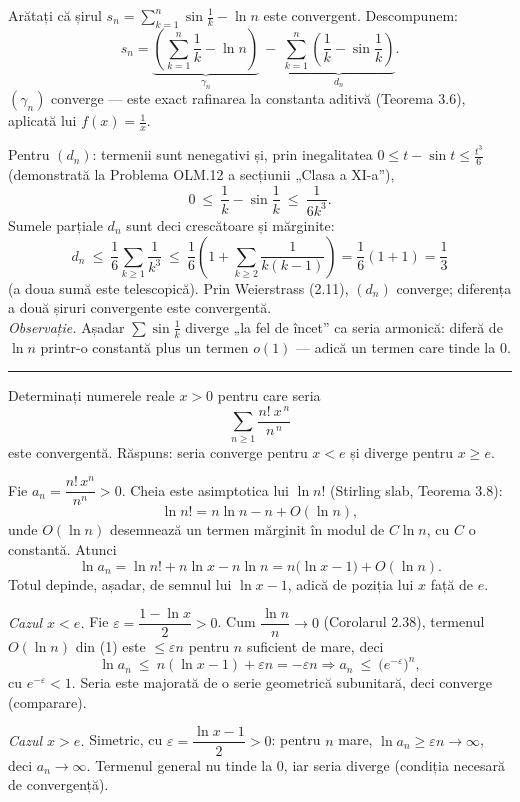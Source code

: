Arătați că șirul $s_n=\displaystyle\sum_{k=1}^{n}\sin\frac1k-\ln n$ este convergent.
\sol Descompunem:
\[ s_n=\underbrace{\left(\sum_{k=1}^n\frac1k-\ln n\right)}_{\gamma_n}\ -\ \underbrace{\sum_{k=1}^n\left(\frac1k-\sin\frac1k\right)}_{d_n} . \]
$(\gamma_n)$ converge --- este exact rafinarea la constanta aditivă (Teorema 3.6), aplicată lui $f(x)=\frac1x$.

Pentru $(d_n)$: termenii sunt nenegativi și, prin inegalitatea $0\le t-\sin t\le\frac{t^3}6$ (demonstrată la Problema OLM.12 a secțiunii „Clasa a XI-a''),
\[ 0\ \le\ \frac1k-\sin\frac1k\ \le\ \frac1{6k^3} . \]
Sumele parțiale $d_n$ sunt deci crescătoare și mărginite:
\[ d_n\ \le\ \frac16\sum_{k\ge1}\frac1{k^3}\ \le\ \frac16\left(1+\sum_{k\ge2}\frac1{k(k-1)}\right)=\frac16(1+1)=\frac13 \]
(a doua sumă este telescopică). Prin Weierstrass (2.11), $(d_n)$ converge; diferența a două șiruri convergente este convergentă.\\[2pt]
\emph{Observație.} Așadar $\sum\sin\frac1k$ diverge „la fel de încet'' ca seria armonică: diferă de $\ln n$ printr-o constantă plus un termen $o(1)$ --- adică un termen care tinde la $0$.
\vspace{1mm}\hrule

Determinați numerele reale $x>0$ pentru care seria
\[ \sum_{n\ge1}\frac{n!\ x^{\,n}}{n^{\,n}} \]
este convergentă.
\sol Răspuns: seria converge pentru $x<e$ și diverge pentru $x\ge e$.

Fie $a_{n}=\dfrac{n!\,x^{n}}{n^{n}}>0$. Cheia este asimptotica lui $\ln n!$ (Stirling slab, Teorema 3.8):
\[ \ln n!=n\ln n-n+O(\ln n) , \]
unde $O(\ln n)$ desemnează un termen mărginit în modul de $C\ln n$, cu $C$ o constantă. Atunci
\[ \ln a_{n}=\ln n!+n\ln x-n\ln n=n\bigl(\ln x-1\bigr)+O(\ln n) . \tag{1} \]
Totul depinde, așadar, de semnul lui $\ln x-1$, adică de poziția lui $x$ față de $e$.

\emph{Cazul $x<e$.} Fie $\varepsilon=\dfrac{1-\ln x}{2}>0$. Cum $\dfrac{\ln n}{n}\to0$ (Corolarul 2.38), termenul $O(\ln n)$ din (1) este $\le\varepsilon n$ pentru $n$ suficient de mare, deci
\[ \ln a_{n}\ \le\ n(\ln x-1)+\varepsilon n=-\varepsilon n \Longrightarrow a_{n}\ \le\ \bigl(e^{-\varepsilon}\bigr)^{n} , \]
cu $e^{-\varepsilon}<1$. Seria este majorată de o serie geometrică subunitară, deci converge (comparare).

\emph{Cazul $x>e$.} Simetric, cu $\varepsilon=\dfrac{\ln x-1}{2}>0$: pentru $n$ mare, $\ln a_{n}\ge\varepsilon n\to\infty$, deci $a_{n}\to\infty$. Termenul general nu tinde la $0$, iar seria diverge (condiția necesară de convergență).

